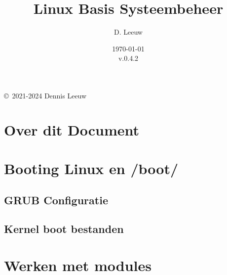 \documentclass[a4paper,12pt,twoside,openright,titlepage]{book}
\author{D. Leeuw}
\title{Linux Basis Systeembeheer}
\date{\today\\v.0.4.2}
\begin{document}

\maketitle

\copyright\ 2021-2024 Dennis Leeuw\\




\frontmatter
\chapter{Over dit Document}
%
%

\tableofcontents

\mainmatter
%

%

\chapter{Booting Linux en /boot/}

\section{GRUB Configuratie}

\section{Kernel boot bestanden}


\chapter{Werken met modules}


\end{document}
